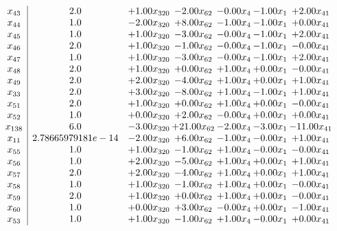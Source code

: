 \documentclass[8pt]{article}
\begin{document}
\[\begin{array}{c| c c@{\hskip 2pt} c@{\hskip 2pt} c@{\hskip 2pt} c@{\hskip 2pt} c@{\hskip 2pt} }
 x_{43}   &  2.0 & +  1.00 x_{320} & -2.00 x_{62} & -0.00 x_{4} & -1.00 x_{1} & +  2.00 x_{41}\\
 x_{44}   &  1.0 & -2.00 x_{320} & +  8.00 x_{62} & -1.00 x_{4} & -1.00 x_{1} & +  0.00 x_{41}\\
 x_{45}   &  1.0 & +  1.00 x_{320} & -3.00 x_{62} & -0.00 x_{4} & -1.00 x_{1} & +  2.00 x_{41}\\
 x_{46}   &  2.0 & +  1.00 x_{320} & -1.00 x_{62} & -0.00 x_{4} & -1.00 x_{1} & -0.00 x_{41}\\
 x_{47}   &  1.0 & +  1.00 x_{320} & -3.00 x_{62} & -0.00 x_{4} & -1.00 x_{1} & +  2.00 x_{41}\\
 x_{48}   &  2.0 & +  1.00 x_{320} & +  0.00 x_{62} & +  1.00 x_{4} & +  0.00 x_{1} & -0.00 x_{41}\\
 x_{49}   &  2.0 & +  2.00 x_{320} & -4.00 x_{62} & +  1.00 x_{4} & +  0.00 x_{1} & +  1.00 x_{41}\\
 x_{33}   &  2.0 & +  3.00 x_{320} & -8.00 x_{62} & +  1.00 x_{4} & -1.00 x_{1} & +  1.00 x_{41}\\
 x_{51}   &  2.0 & +  1.00 x_{320} & +  0.00 x_{62} & +  1.00 x_{4} & +  0.00 x_{1} & -0.00 x_{41}\\
 x_{52}   &  1.0 & +  0.00 x_{320} & +  2.00 x_{62} & -0.00 x_{4} & +  0.00 x_{1} & +  0.00 x_{41}\\
 x_{138}   &  6.0 & -3.00 x_{320} & + 21.00 x_{62} & -2.00 x_{4} & -3.00 x_{1} & -11.00 x_{41}\\
 x_{11}   &  2.78665979181e-14 & -2.00 x_{320} & +  6.00 x_{62} & -1.00 x_{4} & -0.00 x_{1} & +  1.00 x_{41}\\
 x_{55}   &  1.0 & +  1.00 x_{320} & -1.00 x_{62} & +  1.00 x_{4} & -0.00 x_{1} & -0.00 x_{41}\\
 x_{56}   &  1.0 & +  2.00 x_{320} & -5.00 x_{62} & +  1.00 x_{4} & +  0.00 x_{1} & +  1.00 x_{41}\\
 x_{57}   &  2.0 & +  2.00 x_{320} & -4.00 x_{62} & +  1.00 x_{4} & +  0.00 x_{1} & +  1.00 x_{41}\\
 x_{58}   &  1.0 & +  1.00 x_{320} & -1.00 x_{62} & +  1.00 x_{4} & +  0.00 x_{1} & -0.00 x_{41}\\
 x_{59}   &  2.0 & +  1.00 x_{320} & +  0.00 x_{62} & +  1.00 x_{4} & +  0.00 x_{1} & -0.00 x_{41}\\
 x_{60}   &  1.0 & +  0.00 x_{320} & +  3.00 x_{62} & -0.00 x_{4} & +  0.00 x_{1} & -1.00 x_{41}\\
 x_{53}   &  1.0 & +  1.00 x_{320} & -1.00 x_{62} & +  1.00 x_{4} & -0.00 x_{1} & +  0.00 x_{41}\\

\end{array}\]
\end{document}
